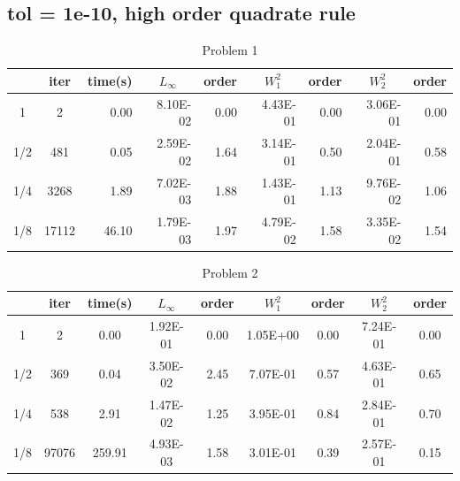 \documentclass{article}
\begin{document}
\subsection{tol = 1e-10, high order quadrate rule}
\begin{table}[H]
	\centering
	\caption{Problem 1}
	\begin{tabular}{|c|c|r|r|r|r|r|r|r|}
		\hline
		& iter  & \multicolumn{1}{c|}{time(s)} & \multicolumn{1}{c|}{$L_{\infty}$} & \multicolumn{1}{c|}{order} & \multicolumn{1}{c|}{$W_1^2$} & \multicolumn{1}{c|}{order} & \multicolumn{1}{c|}{$W_2^2$} & \multicolumn{1}{c|}{order} \\ \hline
		1   & 2     & 0.00                         & 8.10E-02                          & 0.00                       & 4.43E-01                     & 0.00                       & 3.06E-01                     & 0.00                       \\ \hline
		1/2 & 481   & 0.05                         & 2.59E-02                          & 1.64                       & 3.14E-01                     & 0.50                       & 2.04E-01                     & 0.58                       \\ \hline
		1/4 & 3268  & 1.89                         & 7.02E-03                          & 1.88                       & 1.43E-01                     & 1.13                       & 9.76E-02                     & 1.06                       \\ \hline
		1/8 & 17112 & 46.10                        & 1.79E-03                          & 1.97                       & 4.79E-02                     & 1.58                       & 3.35E-02                     & 1.54                       \\ \hline
	\end{tabular}
\end{table}

\begin{table}[H]
	\centering
	\caption{Problem 2}
	\begin{tabular}{|c|c|c|c|c|c|c|c|c|}
		\hline
		& iter  & time(s) & $L_{\infty}$ & order & $W_1^2$  & order & $W_2^2$  & order \\ \hline
		1   & 2     & 0.00    & 1.92E-01     & 0.00  & 1.05E+00 & 0.00  & 7.24E-01 & 0.00  \\ \hline
		1/2 & 369   & 0.04    & 3.50E-02     & 2.45  & 7.07E-01 & 0.57  & 4.63E-01 & 0.65  \\ \hline
		1/4 & 538   & 2.91    & 1.47E-02     & 1.25  & 3.95E-01 & 0.84  & 2.84E-01 & 0.70  \\ \hline
		1/8 & 97076 & 259.91  & 4.93E-03     & 1.58  & 3.01E-01 & 0.39  & 2.57E-01 & 0.15  \\ \hline
	\end{tabular}
\end{table}
\end{document}
